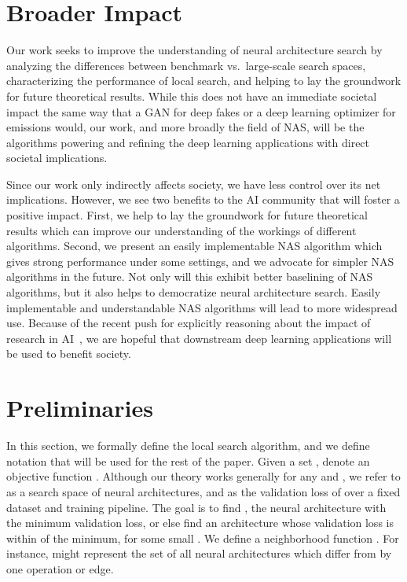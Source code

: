 \documentclass[11pt]{article}
\numberwithin{equation}{section}
\numberwithin{figure}{section}
\theoremstyle{plain}
\theoremstyle{definition}
\begin{document}
 
\section{Broader Impact} \label{sec:impact}

Our work seeks to improve the understanding of neural architecture search
by analyzing the differences between benchmark vs.\ large-scale
search spaces, characterizing the performance of local search,
and helping to lay the groundwork for future theoretical results.
While this does not have an immediate societal impact the same way
that a GAN for deep fakes or a deep learning optimizer for  emissions
would, our work, and more broadly the field of NAS, will be the algorithms
powering and refining the deep learning applications with direct societal
implications.

Since our work only indirectly affects society,
we have less control over its net implications.
However, we see two benefits to the AI community that will foster
a positive impact. First, we help to lay the groundwork for future theoretical
results which can improve our understanding of the workings of different algorithms.
Second, we present an easily implementable NAS algorithm which gives strong performance
under some settings, and we advocate for simpler NAS algorithms in the future.
Not only will this exhibit better baselining of NAS algorithms, but it also helps to
democratize neural architecture search. Easily implementable and understandable NAS
algorithms will lead to more widespread use.
Because of the recent push for explicitly reasoning about the impact of
research in AI~\cite{hecht2018time}, we are hopeful that downstream deep learning
applications will be used to benefit society.

 
\section{Preliminaries} \label{sec:prelim}
In this section, we formally define the local search algorithm,
and we define notation that will be used for the rest of the paper.
Given a set , denote an objective function .
Although our theory works generally for any  and , 
we refer to  as a search space of neural architectures, 
and  as the validation loss of  over a fixed dataset and training pipeline.
The goal is to find , the neural architecture with the 
minimum validation loss, or else find an architecture whose validation loss is within 
 of the minimum, for some small .
We define a neighborhood function . For instance,  might represent 
the set of all neural architectures which differ from  by one operation or edge.
\end{document}
